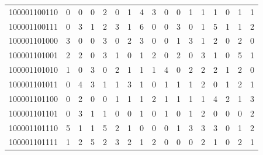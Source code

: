 \documentclass[10pt,a4paper]{article}
\begin{document}
\begin{longtable}{ |c|c|c|c|c|c|c|c|c|c|c|c|c|c|c|c|c| }
    100001100110              & 0                            & 0                                & 0                            & 2                              & 0   & 1   & 4   & 3   & 0   & 0   & 1   & 1   & 1   & 0   & 1   & 1   \\
    100001100111              & 0                            & 3                                & 1                            & 2                              & 3   & 1   & 6   & 0   & 0   & 3   & 0   & 1   & 5   & 1   & 1   & 2   \\
    100001101000              & 3                            & 0                                & 0                            & 3                              & 0   & 2   & 3   & 0   & 0   & 1   & 3   & 1   & 2   & 0   & 2   & 0   \\
    100001101001              & 2                            & 2                                & 0                            & 3                              & 1   & 0   & 1   & 2   & 0   & 2   & 0   & 3   & 1   & 0   & 5   & 1   \\
    100001101010              & 1                            & 0                                & 3                            & 0                              & 2   & 1   & 1   & 1   & 4   & 0   & 2   & 2   & 2   & 1   & 2   & 0   \\
    100001101011              & 0                            & 4                                & 3                            & 1                              & 1   & 3   & 1   & 0   & 1   & 1   & 1   & 2   & 0   & 1   & 2   & 1   \\
    100001101100              & 0                            & 2                                & 0                            & 0                              & 1   & 1   & 1   & 2   & 1   & 1   & 1   & 1   & 4   & 2   & 1   & 3   \\
    100001101101              & 0                            & 3                                & 1                            & 1                              & 0   & 0   & 1   & 0   & 1   & 0   & 1   & 2   & 0   & 0   & 0   & 2   \\
    100001101110              & 5                            & 1                                & 1                            & 5                              & 2   & 1   & 0   & 0   & 0   & 1   & 3   & 3   & 3   & 0   & 1   & 2   \\
    100001101111              & 1                            & 2                                & 5                            & 2                              & 3   & 2   & 1   & 2   & 0   & 0   & 0   & 2   & 1   & 0   & 2   & 1   \\

\end{longtable}
\end{document}

